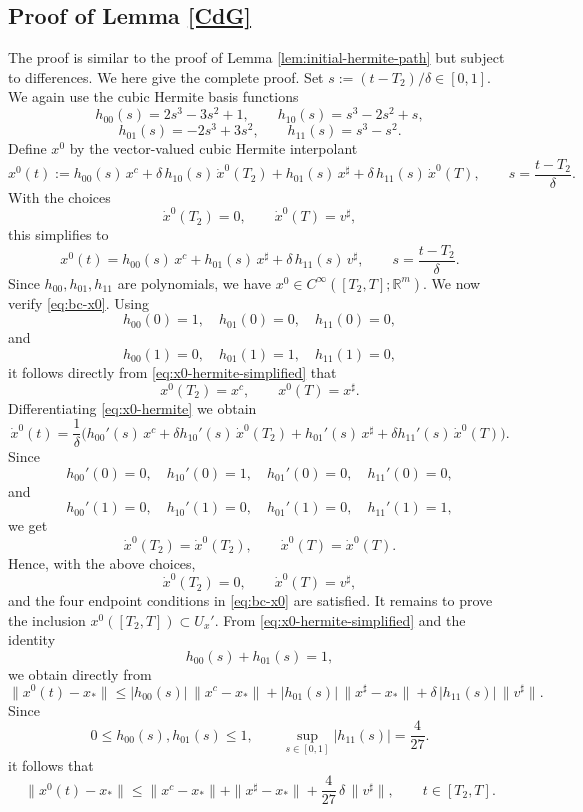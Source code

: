 \documentclass[11pt, a4paper,leqno]{amsart}
\theoremstyle{definition}
\numberwithin{equation}{section}
\begin{document}
\subsection{Proof of Lemma \ref{CdG}}\label{Pr2}  The proof is similar to the proof of Lemma \ref{lem:initial-hermite-path} but subject to differences. We here give the complete proof. Set $s:={(t-T_2)}/{\delta}\in[0,1]$. We again use the cubic Hermite basis functions
\[
h_{00}(s)=2s^3-3s^2+1,\qquad
h_{10}(s)=s^3-2s^2+s,
\]
\[
h_{01}(s)=-2s^3+3s^2,\qquad
h_{11}(s)=s^3-s^2.
\]
Define \(x^0\) by the vector-valued cubic Hermite interpolant
\begin{equation}\label{eq:x0-hermite}
x^0(t)
:=
h_{00}(s)\,x^c
+\delta\,h_{10}(s)\,\dot x^0(T_2)
+h_{01}(s)\,x^\sharp
+\delta\,h_{11}(s)\,\dot x^0(T),
\qquad s=\frac{t-T_2}{\delta}.
\end{equation}
With the choices
\[
\dot x^0(T_2)=0,\qquad \dot x^0(T)=v^\sharp,
\]
this simplifies to
\begin{equation}\label{eq:x0-hermite-simplified}
x^0(t)
=
h_{00}(s)\,x^c
+h_{01}(s)\,x^\sharp
+\delta\,h_{11}(s)\,v^\sharp,
\qquad s=\frac{t-T_2}{\delta}.
\end{equation}
Since \(h_{00},h_{01},h_{11}\) are polynomials, we have $x^0\in C^\infty([T_2,T];\mathbb R^m)$. We now verify \eqref{eq:bc-x0}. Using
\[
h_{00}(0)=1,\quad h_{01}(0)=0,\quad h_{11}(0)=0,
\]
and
\[
h_{00}(1)=0,\quad h_{01}(1)=1,\quad h_{11}(1)=0,
\]
it follows directly from \eqref{eq:x0-hermite-simplified} that
\[
x^0(T_2)=x^c,\qquad x^0(T)=x^\sharp.
\]
Differentiating \eqref{eq:x0-hermite} we obtain
\[
\dot x^0(t)
=
\frac{1}{\delta}
\Big(
h_{00}'(s)\,x^c
+\delta h_{10}'(s)\,\dot x^0(T_2)
+h_{01}'(s)\,x^\sharp
+\delta h_{11}'(s)\,\dot x^0(T)
\Big).
\]
Since
\[
h_{00}'(0)=0,\quad h_{10}'(0)=1,\quad h_{01}'(0)=0,\quad h_{11}'(0)=0,
\]
and
\[
h_{00}'(1)=0,\quad h_{10}'(1)=0,\quad h_{01}'(1)=0,\quad h_{11}'(1)=1,
\]
we get
\[
\dot x^0(T_2)=\dot x^0(T_2),\qquad \dot x^0(T)=\dot x^0(T).
\]
Hence, with the above choices,
\[
\dot x^0(T_2)=0,\qquad \dot x^0(T)=v^\sharp,
\]
and the four endpoint conditions in \eqref{eq:bc-x0} are satisfied. It remains to prove the inclusion \(x^0([T_2,T])\subset U_x'\). From
\eqref{eq:x0-hermite-simplified} and the identity
\[
h_{00}(s)+h_{01}(s)=1,
\]
we obtain
directly from
\[
\|x^0(t)-x_\ast\|
\le
|h_{00}(s)|\,\|x^c-x_\ast\|
+
|h_{01}(s)|\,\|x^\sharp-x_\ast\|
+
\delta\,|h_{11}(s)|\,\|v^\sharp\|.
\]
Since
\[
0\le h_{00}(s), h_{01}(s)\le 1,
\qquad
\sup_{s\in[0,1]}|h_{11}(s)|=\frac{4}{27}.
\]
it follows that
\begin{equation}\label{eq:x0-bound-revised}
\|x^0(t)-x_\ast\|
\le
\|x^c-x_\ast\|
+
\|x^\sharp-x_\ast\|
+
\frac{4}{27}\,\delta\,\|v^\sharp\|,
\qquad t\in[T_2,T].
\end{equation}
\end{document}
